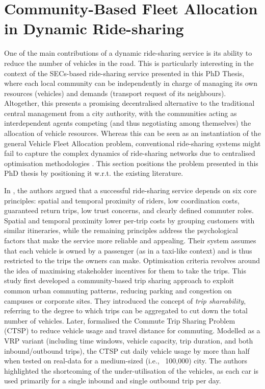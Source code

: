 \section{Community-Based Fleet Allocation in Dynamic Ride-sharing}
\label{sec:community_based_allocation}

One of the main contributions of a dynamic ride-sharing service is its ability to reduce the number of vehicles in the road. This is particularly interesting in the context of the SECs-based ride-sharing service presented in this PhD Thesis, where each local community can be independently in charge of managing its own resources (vehicles) and demands (transport request of its neighbours). Altogether, this presents a promising decentralised alternative to the traditional central management from a city authority, with the communities acting as interdependent agents competing (and thus negotiating among themselves) the allocation of vehicle resources. Whereas this can be seen as an instantiation of the general Vehicle Fleet Allocation problem, conventional ride-sharing systems might fail to capture the complex dynamics of ride-sharing networks due to centralised optimisation methodologies \cite{Reference1,Reference2,Reference4,Reference6}. This section positions the problem presented in this PhD thesis by positioning it w.r.t. the existing literature.


In \cite{hasan2018community}, the authors argued that a successful ride-sharing service depends on six core principles: spatial and temporal proximity of riders, low coordination costs, guaranteed return trips, low trust concerns, and clearly defined commuter roles. Spatial and temporal proximity lower per-trip costs by grouping customers with similar itineraries, while the remaining principles address the psychological factors that make the service more reliable and appealing. Their system assumes that each vehicle is owned by a passenger (as in a taxi-like context) and is thus restricted to the trips the owners can make. Optimisation criteria revolves around the idea of maximising stakeholder incentives for them to take the trips. This study first developed a community-based trip sharing approach to exploit common urban commuting patterns, reducing parking and congestion on campuses or corporate sites. They introduced the concept of \emph{trip shareability}, referring to the degree to which trips can be aggregated to cut down the total number of vehicles. Later, \cite{hasan2020commute} formalised the Commute Trip Sharing Problem (CTSP) to reduce vehicle usage and travel distance for commuting. Modelled as a VRP variant (including time windows, vehicle capacity, trip duration, and both inbound/outbound trips), the CTSP cut daily vehicle usage by more than half when tested on real-data for a medium-sized (i.e., ~100,000) city. The authors highlighted the shortcoming of the under-utilisation of the vehicles, as each car is used primarily for a single inbound and single outbound trip per day.

